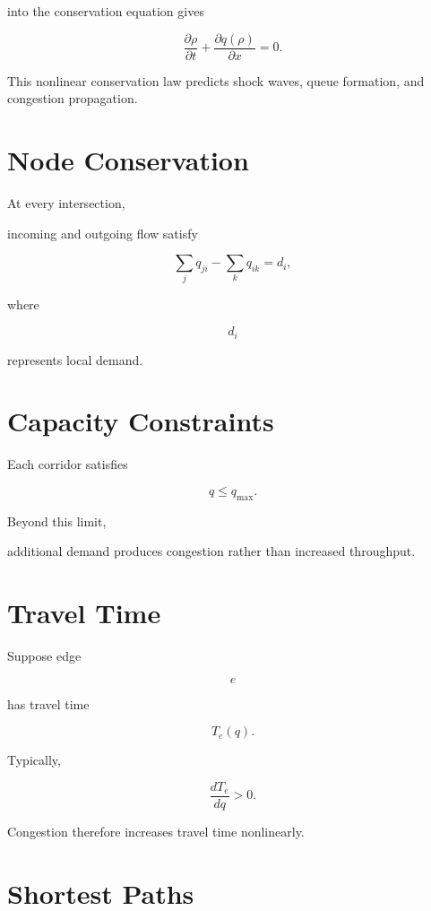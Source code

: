 \documentclass[11pt,fleqn]{book}
\numberwithin{equation}{chapter}
\theoremstyle{plain}
\theoremstyle{definition}
\theoremstyle{remark}
\begin{document}
into the conservation equation gives

\[
\boxed{
\frac{\partial\rho}{\partial t}
+
\frac{\partial q(\rho)}{\partial x}
=
0.
}
\]

This nonlinear conservation law predicts shock waves,
queue formation,
and congestion propagation.


\section{Node Conservation}

At every intersection,

incoming and outgoing flow satisfy

\[
\sum_j
q_{ji}
-
\sum_k
q_{ik}
=
d_i,
\]

where

\[
d_i
\]

represents local demand.


\section{Capacity Constraints}

Each corridor satisfies

\[
q
\le
q_{\max}.
\]

Beyond this limit,

additional demand produces congestion rather than increased throughput.


\section{Travel Time}

Suppose edge

\[
e
\]

has travel time

\[
T_e(q).
\]

Typically,

\[
\frac{dT_e}{dq}
>
0.
\]

Congestion therefore increases travel time nonlinearly.


\section{Shortest Paths}
\end{document}
